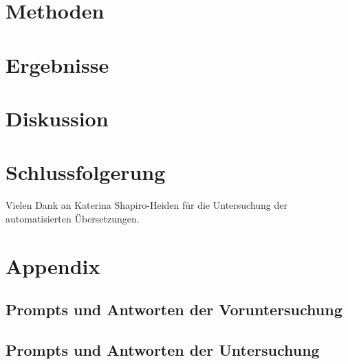 \documentclass[acmlarge,authorversion,nonacm]{acmart}
\begin{document}
\section{Methoden}\label{sec:methods}


\section{Ergebnisse}\label{sec:results}


\section{Diskussion}\label{sec:discussion}


\section{Schlussfolgerung}\label{sec:conclusion}


\begin{acks}
Vielen Dank an Katerina Shapiro-Heiden für die Untersuchung der automatisierten Übersetzungen.
\end{acks}




\newpage
\appendix

\section{Appendix}

\subsection{Prompts und Antworten der Voruntersuchung}


\subsection{Prompts und Antworten der Untersuchung}
\end{document}
